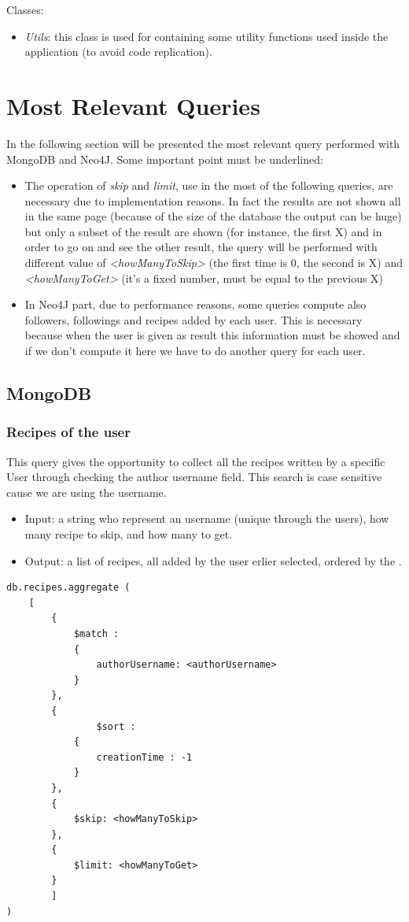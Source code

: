 \documentclass[a4paper]{report}
\begin{document}
\noindent Classes:
 \begin{itemize}
	\item \emph{Utils}: this class is used for containing some utility functions used inside the application (to avoid code replication).
\end{itemize}
\section{Most Relevant Queries}
In the following section will be presented the most relevant query performed with MongoDB and Neo4J. 
\noindent Some important point must be underlined:
\begin{itemize}
	\item The operation of \emph{skip} and \emph{limit}, use in the most of the following queries, are necessary due  to implementation reasons. In fact the results are not shown all in the same page (because of the size of the database the output can be huge) but only a subset of the result are shown (for instance, the first X) and in order to go on and see the other result, the query will be performed with different value of \emph{<howManyToSkip>} (the first time is 0, the second is X) and \emph{<howManyToGet>} (it's a fixed number, must be equal to the previous X)
	\item In Neo4J part, due to performance reasons, some queries compute also followers, followings and recipes added by each user. This is necessary because when the user is given as result this information must be showed and if we don't compute it here we have to do another query for each user.
\end{itemize}

\subsection{MongoDB}

\subsubsection{Recipes of the user}

This query gives the opportunity to collect all the recipes written by a specific User through checking the author username field. This search is case sensitive cause we are using the username.
\begin{itemize}
	\item Input: a string who represent an username (unique through the users), how many recipe to skip, and how many to get.
	\item Output: a list of recipes, all added by the user erlier selected, ordered by the .
\end{itemize}
\lstset{ language=C++}
\begin{lstlisting}
db.recipes.aggregate (
	[
		{ 
			$match : 
			{ 
				authorUsername: <authorUsername>
			}  
		},
		{ 
				$sort : 
			{ 
				creationTime : -1 
			} 
		},
		{ 
			$skip: <howManyToSkip> 
		},
		{ 
			$limit: <howManyToGet> 
		}	
		]
)
\end{lstlisting}
\end{document}
